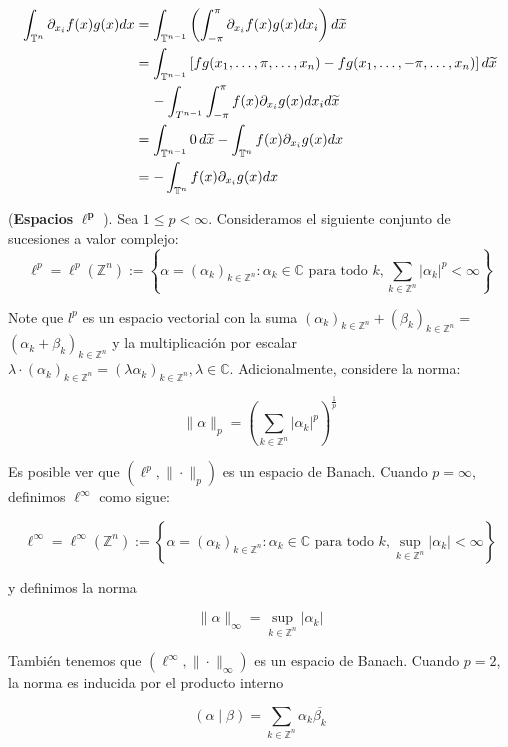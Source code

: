 \documentclass[12pt]{article}
\newcommand\Z{\ensuremath{\mathbb{Z}}}
\newcommand\T{\mathbb{T}}
\begin{document}
    \begin{align*}
        \int_{\mathbb{T}^n} \partial_{x_i} f(x) g(x) d x&=\int_{\T ^{n-1}}\left(\int_{-\pi}^{\pi}\partial_{x_i} f(x) g(x)dx_{i}\right)d\widetilde{x}\\
        &=\int_{\T^{n-1}}\left[fg(x_1,\ldots,\pi,\ldots,x_n)-fg(x_1,\ldots,-\pi,\ldots,x_n)\right]d\widetilde{x}\\
        &\hspace*{0.4cm}-\int_{T^{n-1}}\int_{-\pi}^{\pi}f(x)\partial_{x_i}g(x)dx_id\widetilde{x}\\
        &=\int_{\T^{n-1}}0\,d\widetilde{x}-\int_{\T^n}f(x)\partial_{x_i}g(x)dx\\
        &=-\int_{\T^n}f(x)\partial_{x_i}g(x)dx
    \end{align*}

(\textbf{Espacios} $\mathbf{\ell^p}$ ). Sea $1 \leq p<\infty$. Consideramos el siguiente conjunto de sucesiones  a valor complejo:
$$
\ell^p=\ell^p(\mathbb{Z}^n):=\left\{\alpha=\left(\alpha_k\right)_{k \in \mathbb{Z}^n}: \alpha_k \in \mathbb{C} \text { para todo } k, \sum_{k\in \Z^n}\left|\alpha_k\right|^p<\infty\right\}
$$


Note que $l^p$ es un espacio vectorial con la suma $\left(\alpha_k\right)_{k \in \mathbb{Z}^n}+\left(\beta_k\right)_{k \in \mathbb{Z}^n}=$ $\left(\alpha_k+\beta_k\right)_{k \in \mathbb{Z}^n}$ y la multiplicación por escalar $\lambda \cdot\left(\alpha_k\right)_{k \in \mathbb{Z}^n}=\left(\lambda \alpha_k\right)_{k \in \mathbb{Z}^n}, \lambda \in \mathbb{C}$. Adicionalmente, considere la norma:

$$
\|\alpha\|_p=\left(\sum_{k\in \Z^n}\left|\alpha_k\right|^p\right)^{\frac{1}{p}}
$$


Es posible ver que $\left(\ell^p,\|\cdot\|_p\right)$ es un espacio de Banach. Cuando $p=\infty$, definimos $\ell^{\infty}$ como sigue:

$$
\ell^{\infty}=\ell^{\infty}(\mathbb{Z}^n):=\left\{\alpha=\left(\alpha_k\right)_{k \in \mathbb{Z}^n}: \alpha_k \in \mathbb{C} \text { para todo } k, \sup _{k \in \mathbb{Z}^n}\left|\alpha_k\right|<\infty\right\}
$$

y definimos la norma

$$
\|\alpha\|_{\infty}=\sup _{k \in \mathbb{Z}^n}\left|\alpha_k\right|
$$


También tenemos que $\left(\ell^{\infty},\|\cdot\|_{\infty}\right)$ es un espacio de Banach.
Cuando $p=2$, la norma es inducida por el producto interno

$$
(\alpha \mid \beta)=\sum_{k\in \Z^n} \alpha_k \overline{\beta_k}
$$
\end{document}

